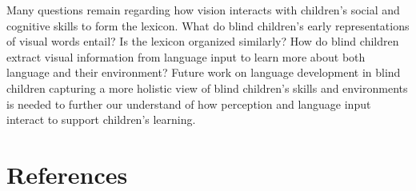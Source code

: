\documentclass[
  man,floatsintext]{apa6}
\begin{document}
Many questions remain regarding how vision interacts with children's social and cognitive skills to form the lexicon. What do blind children's early representations of visual words entail? Is the lexicon organized similarly? How do blind children extract visual information from language input to learn more about both language and their environment? Future work on language development in blind children capturing a more holistic view of blind children's skills and environments is needed to further our understand of how perception and language input interact to support children's learning.

\hypertarget{references}{%
\section*{References}\label{references}}
\end{document}
